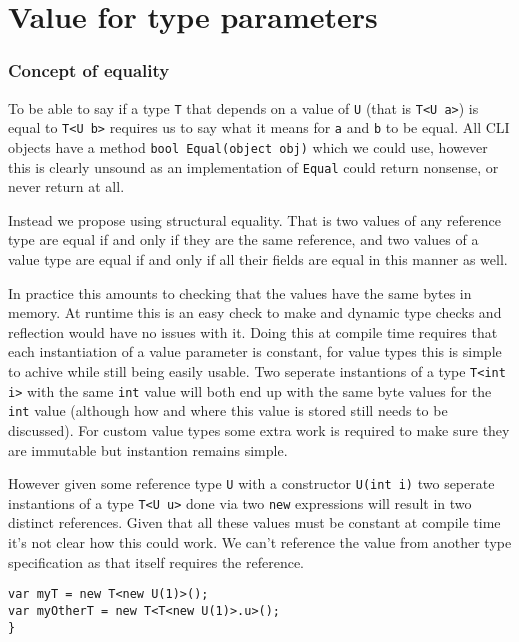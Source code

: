 \chapter{Value for type parameters}

\subsection{Concept of equality}

To be able to say if a type \texttt{T} that depends on a value of
\texttt{U} (that is \texttt{T<U a>}) is equal to \texttt{T<U b>} requires
us to say what it means for \texttt{a} and \texttt{b} to be equal.
All CLI objects have a method \texttt{bool Equal(object obj)} which
we could use, however this is clearly unsound as an implementation
of \texttt{Equal} could return nonsense, or never return at all.

Instead we propose using structural equality. That is
two values of any reference type are equal if and only if they are
the same reference, and two values of a value type are equal if and
only if all their fields are equal in this manner as well. 

In practice this amounts to checking that the values have the same bytes in memory.
At runtime this is an easy check to make and dynamic type checks and reflection would have
no issues with it. Doing this at compile time requires that each instantiation of a value 
parameter is constant, for value types this is simple to achive while still being easily usable.
Two seperate instantions of a type \texttt{T<int i>} with the same \texttt{int} value will both end 
up with the same byte values for the \texttt{int} value (although how and where this value is stored 
still needs to be discussed). For custom value types some extra work is required to make sure they are
immutable but instantion remains simple. 

However given some reference type \texttt{U} with a constructor \texttt{U(int i)} two seperate instantions of 
a type \texttt{T<U u>} done via two \texttt{new} expressions will result in two distinct references. 
Given that all these values must be constant at compile time it's not clear how this could work. We can't 
reference the value from another type specification as that itself requires the reference.

\begin{lstlisting}[caption={An issue with refernce values},keywordstyle={\color{blue}},language=sharpc]
var myT = new T<new U(1)>();
var myOtherT = new T<T<new U(1)>.u>();
}
\end{lstlisting}

